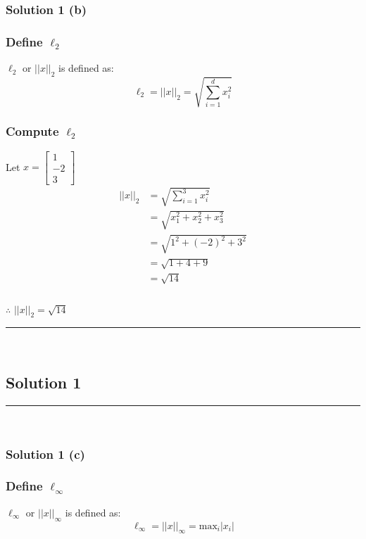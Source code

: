 \documentclass{article}
\begin{document}
\subsubsection*{Solution 1 (b)}
\subsubsection*{Define $\ell_2$}
\parbox{\textwidth}{
$\ell_2$ or $||x||_2$ is defined as:
$$\ell_{2} = ||x||_2 = \sqrt{\sum_{i=1}^{d} x_{i}^2} $$
}
\subsubsection*{Compute $\ell_2$}
\parbox{\textwidth}{
Let $x=\begin{bmatrix} 1 \\ -2 \\ 3 \end{bmatrix}$ \\

\begin{align*}
  ||x||_2 &= \sqrt{\sum_{i=1}^{3} x_{i}^{2}} \\
  &= \sqrt{x_{1}^2 + x_{2}^{2} + x_{3}^{2}} \\
  &= \sqrt{1^{2} + (-2)^{2} + 3^{2}} \\
  &= \sqrt{1 + 4 + 9} \\
  &= \sqrt{14}
\end{align*}
}


\subsubsection*{\normalfont}{$\therefore$ $||x||_{2} = \sqrt{14}$}

\noindent\rule{\textwidth}{0.4pt}\\

\newpage

\subsection*{Solution 1}
\noindent\rule{\textwidth}{0.4pt}\\

\subsubsection*{Solution 1 (c)}
\subsubsection*{Define $\ell_{\infty}$}
\parbox{\textwidth}{
$\ell_{\infty}$ or $||x||_{\infty}$ is defined as:
$$\ell_{\infty} = ||x||_{\infty} = \text{max}_{i}\left|x_{i}\right| $$
}
\end{document}
